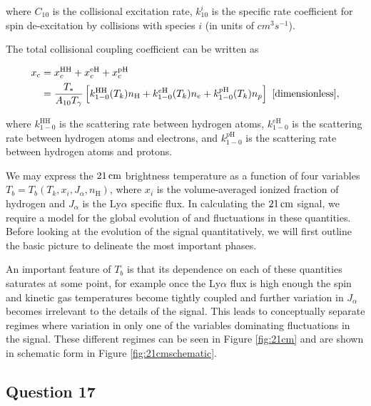 \documentclass[a4paper,11pt]{article}
\begin{document}
{\noindent}where $C_{10}$ is the collisional excitation rate, $k_{10}^i$ is the specific rate coefficient for spin de-excitation by collisions with species $i$ (in units of $cm^3s^{-1}$).

{\noindent}The total collisional coupling coefficient can be written as

\begin{align*}
    x_c &= x_c^\mathrm{HH} + x_c^\mathrm{eH} + x_c^\mathrm{pH} \\
        &= \frac{T_*}{A_{10}T_\gamma} \left[k_{1-0}^\mathrm{HH}(T_k)n_\mathrm{H}+k_{1-0}^{e\mathrm{H}}(T_k)n_e+k_{1-0}^{p\mathrm{H}}(T_k)n_p\right] ~ [{\rm dimensionless}],
\end{align*}

{\noindent}where $k_{1-0}^\mathrm{HH}$ is the scattering rate between hydrogen atoms, $k_{1-0}^{e\mathrm{H}}$ is the scattering rate between hydrogen atoms and electrons, and $k_{1-0}^{p\mathrm{H}}$ is the scattering rate between hydrogen atoms and protons.

{\noindent}We may express the $21\,{\rm cm}$ brightness temperature as a function of four variables $T_b=T_b(T_k,x_i,J_\alpha,n_\mathrm{H})$, where $x_i$ is the volume-averaged ionized fraction of hydrogen and $J_\alpha$ is the Ly$\alpha$ specific flux. In calculating the $21\,{\rm cm}$ signal, we require a model for the global evolution of and fluctuations in these quantities. Before looking at the evolution of the signal quantitatively, we will first outline the basic picture to delineate the most important phases.

{\noindent}An important feature of $T_b$ is that its dependence on each of these quantities saturates at some point, for example once the Ly$\alpha$ flux is high enough the spin and kinetic gas temperatures become tightly coupled and further variation in $J_\alpha$ becomes irrelevant to the details of the signal. This leads to conceptually separate regimes where variation in only one of the variables dominating fluctuations in the signal. These different regimes can be seen in Figure \ref{fig:21cm} and are shown in schematic form in Figure \ref{fig:21cmschematic}.

%
%

\newpage
\subsection{Question 17}
\end{document}
